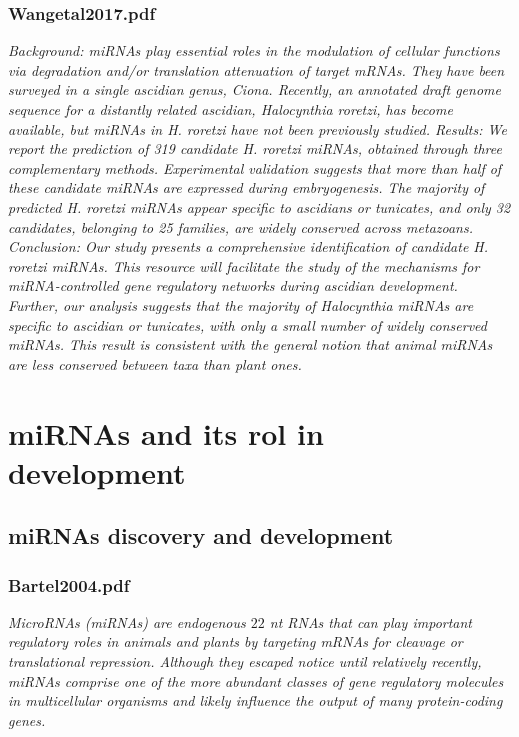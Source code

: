 \documentclass[graybox]{svmult}
\begin{document}
\subsubsection{Wangetal2017.pdf}
\cite{Wang2017}
\textit{Background: miRNAs play essential roles in the modulation of cellular functions via degradation and/or translation
attenuation of target mRNAs. They have been surveyed in a single ascidian genus, Ciona. Recently, an annotated
draft genome sequence for a distantly related ascidian, Halocynthia roretzi, has become available, but miRNAs in
H. roretzi have not been previously studied.
Results: We report the prediction of 319 candidate H. roretzi miRNAs, obtained through three complementary
methods. Experimental validation suggests that more than half of these candidate miRNAs are expressed during
embryogenesis. The majority of predicted H. roretzi miRNAs appear specific to ascidians or tunicates, and only 32
candidates, belonging to 25 families, are widely conserved across metazoans.
Conclusion: Our study presents a comprehensive identification of candidate H. roretzi miRNAs. This resource
will facilitate the study of the mechanisms for miRNA-controlled gene regulatory networks during ascidian
development. Further, our analysis suggests that the majority of Halocynthia miRNAs are specific to ascidian
or tunicates, with only a small number of widely conserved miRNAs. This result is consistent with the general
notion that animal miRNAs are less conserved between taxa than plant ones.}

\fi

\section{miRNAs and its rol in development}
\label{sec:3}

\subsection{miRNAs discovery and development}
\subsubsection{Bartel2004.pdf}

\cite{Bartel2004}
\textit{MicroRNAs (miRNAs) are endogenous $22$ nt RNAs that can play important regulatory roles in animals and plants by targeting mRNAs for cleavage or translational repression. Although they escaped notice until relatively recently, miRNAs comprise one of the more abundant classes of gene regulatory molecules in multicellular organisms and likely influence the output of many protein-coding genes.}
\end{document}
